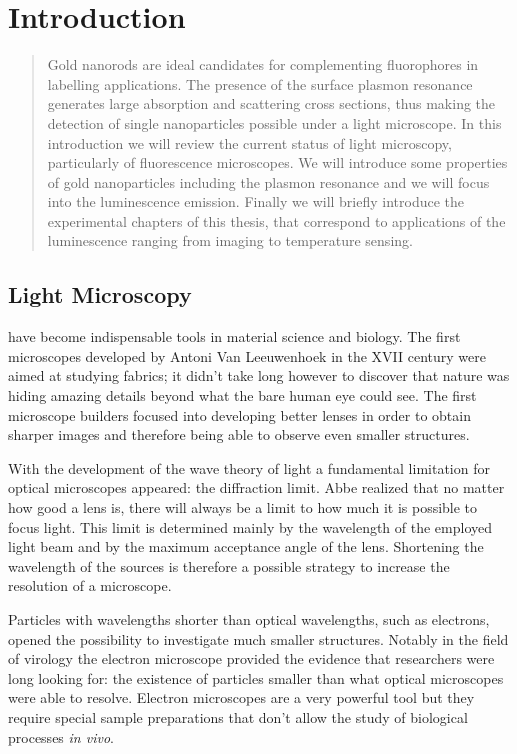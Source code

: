 \chapter{Introduction}
\label{introductions}

\begin{abstract}
Gold nanorods are ideal candidates for complementing fluorophores in labelling
applications. The presence of the surface plasmon resonance generates large
absorption and scattering cross sections, thus making the detection of single
nanoparticles possible under a light microscope. In this introduction we will
review the current status of light microscopy, particularly of fluorescence
microscopes. We will introduce some properties of gold nanoparticles including
the plasmon resonance and we will focus into the luminescence emission.
Finally we will briefly introduce the experimental chapters of this
thesis, that correspond to applications of the luminescence ranging from imaging to
temperature sensing.
\end{abstract}

\newpage

\section{Light Microscopy}
 have become indispensable tools in material science and
biology. The first microscopes developed by Antoni Van Leeuwenhoek in the XVII
century were aimed at studying fabrics; it didn't take long however to discover
that nature was hiding amazing details beyond what the bare human eye could see.
The first microscope builders focused into developing better lenses in order to
obtain sharper images and therefore being able to observe even smaller
structures.

With the development of the wave theory of light a fundamental limitation for
optical microscopes appeared: the diffraction limit. Abbe realized that no
matter how good a lens is, there will always be a limit to how much it is
possible to focus light. This limit is determined mainly by the wavelength of
the employed light beam and by the maximum acceptance angle of the lens.
Shortening the wavelength of the sources is therefore a possible strategy to
increase the resolution of a microscope.

Particles with wavelengths shorter than optical wavelengths, such as electrons,
opened the possibility to investigate much smaller structures\cite{Kausche1939}.
Notably in the field of virology the electron microscope provided the evidence
that researchers were long looking for: the existence of particles smaller than
what optical microscopes were able to resolve. Electron microscopes are a very
powerful tool but they require special sample preparations that don't allow the
study of biological processes \textit{in vivo}.

